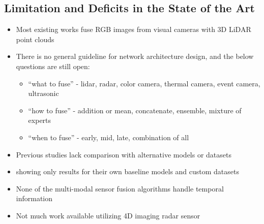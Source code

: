 \documentclass[rnd]{mas_proposal}
\begin{document}
\subsection{Limitation and Deficits in the State of the Art}
\begin{itemize}

    \item Most existing works fuse RGB images from visual cameras with 3D LiDAR point clouds    
    \cite{feng2020deep}
    
    \item There is no general guideline for network architecture design, and the below questions are still open\cite{Zhou2022May}: 
        \begin{itemize}
            \item “what to fuse” - lidar, radar, color camera, thermal camera, event camera, ultrasonic 
            \item “how to fuse” - addition or mean, concatenate, ensemble, mixture of experts
            \item “when to fuse” - early, mid, late, combination of all
        \end{itemize}

    \item Previous studies lack comparison with alternative models or datasets
    \item showing only results for their own baseline models and custom datasets
    
    \item None of the multi-modal sensor fusion algorithms handle temporal information
    \cite{bijelic2020seeing}
    
    \item Not much work available utilizing 4D imaging radar sensor 
    \cite{Zhou2022May}    


\end{itemize}
\end{document}
